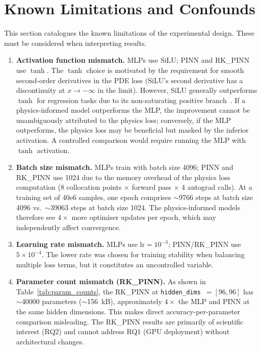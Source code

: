 \documentclass[a4paper,11pt]{article}
\newcommand{\SI}[2]{#1~#2}
\newcommand{\num}[1]{#1}
\newcommand{\kilo}{k}
\newcommand{\byte}{B}
\begin{document}
\section{Known Limitations and Confounds}
\label{sec:confounds}

This section catalogues the known limitations of the experimental design.
These must be considered when interpreting results.

\begin{enumerate}
  \item \textbf{Activation function mismatch.}
    MLPs use SiLU; PINN and RK\_PINN use $\tanh$.  The $\tanh$ choice is
    motivated by the requirement for smooth second-order derivatives in
    the PDE loss (SiLU's second derivative has a discontinuity at
    $x \to -\infty$ in the limit).  However, SiLU generally outperforms
    $\tanh$ for regression tasks due to its non-saturating positive
    branch~\cite{SiLU}.  If a physics-informed model outperforms the MLP,
    the improvement cannot be unambiguously attributed to the physics loss;
    conversely, if the MLP outperforms, the physics loss may be beneficial
    but masked by the inferior activation.  A controlled comparison would
    require running the MLP with $\tanh$ activation.

  \item \textbf{Batch size mismatch.}
    MLPs train with batch size 4096; PINN and RK\_PINN use 1024 due to
    the memory overhead of the physics loss computation (8 collocation
    points $\times$ forward pass $\times$ 4 autograd calls).  At a
    training set of \num{40e6} samples, one epoch comprises $\sim$9766
    steps at batch size 4096 vs.\ $\sim$39063 steps at batch size 1024.
    The physics-informed models therefore see $4\times$ more optimiser
    updates per epoch, which may independently affect convergence.

  \item \textbf{Learning rate mismatch.}
    MLPs use $\text{lr} = 10^{-3}$; PINN/RK\_PINN use $5 \times 10^{-4}$.
    The lower rate was chosen for training stability when balancing
    multiple loss terms, but it constitutes an uncontrolled variable.

  \item \textbf{Parameter count mismatch (RK\_PINN).}
    As shown in Table~\ref{tab:param_counts}, the RK\_PINN at
    \texttt{hidden\_dims}~$= [96, 96]$ has $\sim$\num{40000} parameters
    ($\sim$\SI{156}{\kilo\byte}), approximately $4\times$ the MLP and
    PINN at the same hidden dimensions.  This makes direct
    accuracy-per-parameter comparison misleading.  The RK\_PINN results
    are primarily of scientific interest (RQ2) and cannot address RQ1
    (GPU deployment) without architectural changes.


\end{enumerate}
\end{document}
